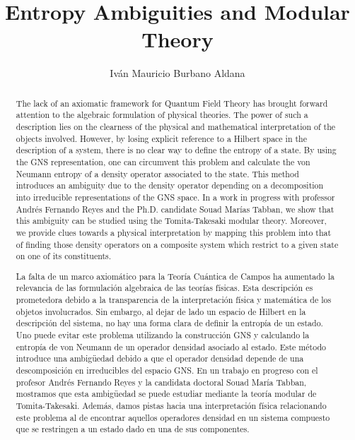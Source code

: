 \documentclass{article}
\title{Entropy Ambiguities and Modular Theory}
\author{Iván Mauricio Burbano Aldana}
\begin{document}
\maketitle

\begin{abstract}

The lack of an axiomatic framework for Quantum Field Theory has brought forward attention to the algebraic formulation of physical theories\cite{Haag1992}. The  power of such a description lies on the clearness of the physical and mathematical interpretation of the objects involved. However, by losing explicit reference to a Hilbert space in the description of a system, there is no clear way to define the entropy of a state. By using the GNS representation, one can circumvent this problem and calculate the von Neumann entropy of a density operator associated to the state. This method introduces an ambiguity due to the density operator depending on a decomposition into irreducible representations of the GNS space\cite{Balachandran2013b}. In a work in progress with professor Andrés Fernando Reyes and the Ph.D. candidate Souad Marías Tabban, we show that this ambiguity can be studied using the Tomita-Takesaki modular theory. Moreover, we provide clues towards a physical interpretation by mapping this problem into that of finding those density operators on a composite system which restrict to a given state on one of its constituents.  

\end{abstract}

\begin{otherlanguage}{spanish}

\begin{abstract}

La falta de un marco axiomático para la Teoría Cuántica de Campos ha aumentado la relevancia de las formulación algebraica de las teorías físicas\cite{Haag1992}. Esta descripción es prometedora debido a la transparencia de la interpretación física y matemática de los objetos involucrados. Sin embargo, al dejar de lado un espacio de Hilbert en la descripción del sistema, no hay una forma clara de definir la entropía de un estado. Uno puede evitar este problema utilizando la construcción GNS y calculando la entropía de von Neumann de un operador densidad asociado al estado. Este método introduce una ambigüedad debido a que el operador densidad depende de una descomposición en irreducibles del espacio GNS\cite{Balachandran2013b}. En un trabajo en progreso con el profesor Andrés Fernando Reyes y la candidata doctoral Souad María Tabban, mostramos que esta ambigüedad se puede estudiar mediante la teoría modular de Tomita-Takesaki. Además, damos pistas hacia una interpretación física relacionando este problema al de encontrar aquellos operadores densidad en un sistema compuesto que se restringen a un estado dado en una de sus componentes.

\end{abstract}

\end{otherlanguage}

\nocite{*}



\end{document}
